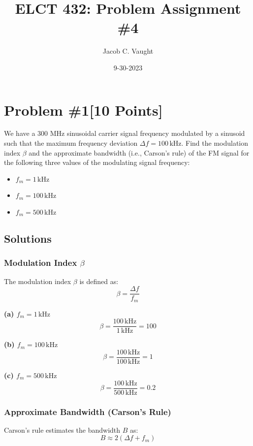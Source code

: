 \documentclass{article}
\begin{document}
\title{ELCT 432: Problem Assignment \#4}
\author{Jacob C. Vaught}
\date{9-30-2023}
\maketitle

\section*{Problem \#1[10 Points]}

We have a 300 MHz sinusoidal carrier signal frequency modulated by a sinusoid such that the maximum frequency deviation \( \Delta f = 100 \, \text{kHz} \). Find the modulation index \( \beta \) and the approximate bandwidth (i.e., Carson's rule) of the FM signal for the following three values of the modulating signal frequency:

\begin{itemize}
  \item[(a)] \( f_m = 1 \, \text{kHz} \)
  \item[(b)] \( f_m = 100 \, \text{kHz} \)
  \item[(c)] \( f_m = 500 \, \text{kHz} \)
\end{itemize}

\subsection*{Solutions}

\subsubsection*{Modulation Index \( \beta \)}

The modulation index \( \beta \) is defined as:
\[
\beta = \frac{\Delta f}{f_m}
\]

\textbf{(a) \( f_m = 1 \, \text{kHz} \)}
\[
\beta = \frac{100 \, \text{kHz}}{1 \, \text{kHz}} = 100
\]

\textbf{(b) \( f_m = 100 \, \text{kHz} \)}
\[
\beta = \frac{100 \, \text{kHz}}{100 \, \text{kHz}} = 1
\]

\textbf{(c) \( f_m = 500 \, \text{kHz} \)}
\[
\beta = \frac{100 \, \text{kHz}}{500 \, \text{kHz}} = 0.2
\]

\subsubsection*{Approximate Bandwidth (Carson's Rule)}

Carson's rule estimates the bandwidth \( B \) as:
\[
B \approx 2(\Delta f + f_m)
\]
\end{document}
